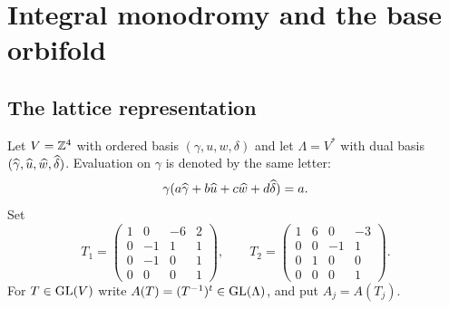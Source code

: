 \section{Integral monodromy and the base orbifold}

\subsection{The lattice representation}
Let $V=\mathbb Z^4$ with ordered basis $(\gamma,u,w,\delta)$ and let
$\Lambda=V^*$ with dual basis
$(\widehat\gamma,\widehat u,\widehat w,\widehat\delta)$.  Evaluation on $\gamma$ is denoted
by the same letter:
\[
 \gamma(a\widehat\gamma+b\widehat u+c\widehat w+d\widehat\delta)=a.
\]
Set
\[
T_1=
\begin{pmatrix}
1&0&-6&2\\
0&-1&1&1\\
0&-1&0&1\\
0&0&0&1
\end{pmatrix},
\qquad
T_2=
\begin{pmatrix}
1&6&0&-3\\
0&0&-1&1\\
0&1&0&0\\
0&0&0&1
\end{pmatrix}.
\]
For $T\in\operatorname{GL}(V)$ write $A(T)=(T^{-1})^t\in\operatorname{GL}(\Lambda)$, and put
$A_j=A(T_j)$.

